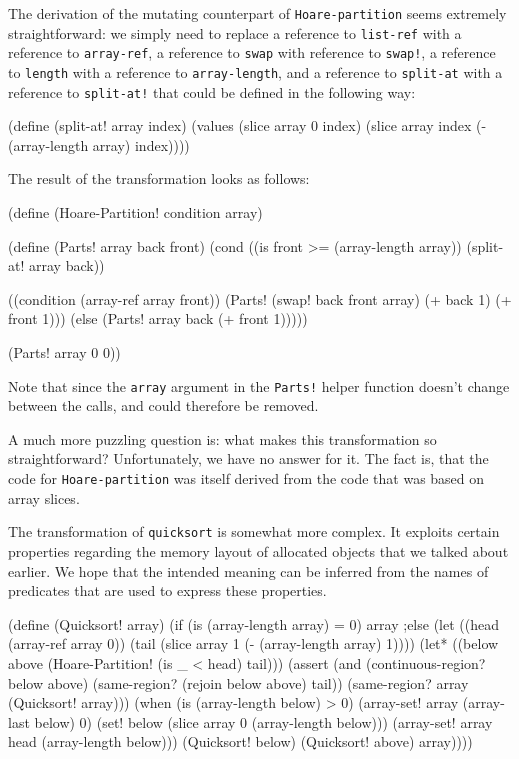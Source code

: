 The derivation of the mutating counterpart of \texttt{Hoare-partition}
seems extremely straightforward: we simply need to replace a reference
to \texttt{list-ref} with a reference to \texttt{array-ref}, a reference
to \texttt{swap} with reference to \texttt{swap!}, a reference to
\texttt{length} with a reference to \texttt{array-length}, and
a reference to \texttt{split-at} with a reference to \texttt{split-at!}
that could be defined in the following way:

\begin{Snippet}
(define (split-at! array index)
  (values (slice array 0 index)
          (slice array index (- (array-length array)
                                index))))
\end{Snippet}

The result of the transformation looks as follows:

\begin{Snippet}
(define (Hoare-Partition! condition array)
  
  (define (Parts! array back front)
    (cond ((is front >= (array-length array))
	   (split-at! array back))
	
	  ((condition (array-ref array front))
           (Parts! (swap! back front array) (+ back 1)
                                            (+ front 1)))
	  (else
	   (Parts! array back (+ front 1)))))
  
  (Parts! array 0 0))  
\end{Snippet}

Note that since the \texttt{array} argument in the \texttt{Parts!}
helper function doesn't change between the calls, and could therefore be
removed.

A much more puzzling question is: what makes this transformation so
straightforward? Unfortunately, we have no answer for it. The fact is,
that the code for \texttt{Hoare-partition} was itself derived from
the code that was based on array slices.

The transformation of \texttt{quicksort} is somewhat more complex.
It exploits certain properties regarding the memory layout of allocated
objects that we talked about earlier. We hope that the intended meaning
can be inferred from the names of predicates that are used to express
these properties.

\begin{Snippet}
(define (Quicksort! array)
  (if (is (array-length array) = 0)
      array
  ;else
      (let ((head (array-ref array 0))
            (tail (slice array 1 (- (array-length array) 1))))
        (let* ((below above (Hoare-Partition! (is _ < head) tail)))
          (assert (and (continuous-region? below above)
                       (same-region? (rejoin below above) tail))
                       (same-region? array (Quicksort! array)))
            (when (is (array-length below) > 0)
              (array-set! array (array-last below) 0)
              (set! below (slice array 0 (array-length below)))
              (array-set! array head (array-length below)))
            (Quicksort! below)
            (Quicksort! above)
            array))))
\end{Snippet}

